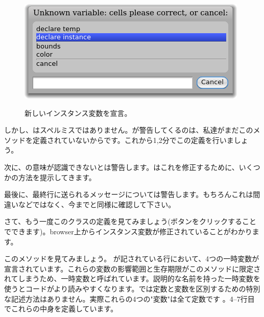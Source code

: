 \documentclass[a4paper,10pt,twoside]{book}
\begin{document}
\begin{figure}[htb]
\begin{minipage}{0.48\textwidth}
		{\includegraphics[scale=0.7]{DeclareInstanceVar}}
	\caption{新しいインスタンス変数を宣言。}
\end{minipage}
\end{figure}

しかし、はスペルミスではありません。\pharo{}が警告してくるのは、私達がまだこのメソッドを定義されていないからです。これから1,2分でこの定義を行いましょう。


次に、の意味が認識できないと\pharo{}は警告します。\pharo{}はこれを修正するために、いくつかの方法を提示してきます。

最後に、最終行に送られるメッセージについて\pharo{}は警告します。もちろんこれは間違いなどではなく、今までと同様に確認して下さい。

さて、もう一度このクラスの定義を見てみましょう(ボタンをクリックすることでできます)。browser上からインスタンス変数が修正されていることがわかります。

このメソッドを見てみましょう。
が記されている行において、4つの一時変数が宣言されています。これらの変数の影響範囲と生存期限がこのメソッドに限定されてしまうため、一時変数と呼ばれています。説明的な名前を持った一時変数を使うとコードがより読みやすくなります。\st{}では定数と変数を区別するための特別な記述方法はありません。実際これらの4つの"変数"は全て定数です
。4--7行目でこれらの中身を定義しています。
\end{document}
